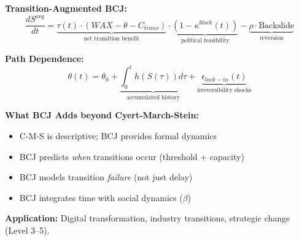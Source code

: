 \begin{tcolorbox}[colback=cyan!5!white, colframe=cyan!75!black,
    title=Theorem BCJ-T43: Time \& Transition Dynamics as Special Case]
\textbf{Transition-Augmented BCJ:}
\begin{equation}
\frac{dS^{org}}{dt} = \underbrace{\tau(t) \cdot (WAX - \theta - C_{trans})}_{\text{net transition benefit}} \cdot \underbrace{(1-\kappa^{block}(t))}_{\text{political feasibility}} - \underbrace{\rho \cdot \text{Backslide}}_{\text{reversion}}
\end{equation}

\textbf{Path Dependence:}
\begin{equation}
\theta(t) = \theta_0 + \underbrace{\int_0^t h(S(\tau)) d\tau}_{\text{accumulated history}} + \underbrace{\epsilon_{lock-in}(t)}_{\text{irreversibility shocks}}
\end{equation}

\textbf{What BCJ Adds beyond Cyert-March-Stein:}
\begin{itemize}[nosep]
\item C-M-S is descriptive; BCJ provides formal dynamics
\item BCJ predicts \textit{when} transitions occur (threshold + capacity)
\item BCJ models transition \textit{failure} (not just delay)
\item BCJ integrates time with social dynamics ($\beta$)
\end{itemize}

\textbf{Application:} Digital transformation, industry transitions, strategic change (Level 3--5).
\end{tcolorbox}

